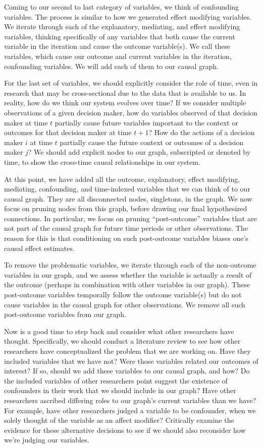 Coming to our second to last category of variables, we think of confounding variables.
The process is similar to how we generated effect modifying variables.
We iterate through each of the explanatory, mediating, and effect modifying variables, thinking specifically of any variables that both cause the current variable in the iteration and cause the outcome variable(s).
We call these variables, which cause our outcome and current variables in the iteration, confounding variables.
We will add each of them to our causal graph.

For the last set of variables, we should explicitly consider the role of time, even in research that may be cross-sectional due to the data that is available to us.
In reality, how do we think our system evolves over time?
If we consider multiple observations of a given decision maker, how do variables observed of that decision maker at time $t$ partially cause future variables important to the context or outcomes for that decision maker at time $t+1$?
How do the actions of a decision maker $i$ at time $t$ partially cause the future context or outcomes of a decision maker $j$?
We should add explicit nodes to our graph, subscripted or denoted by time, to show the cross-time causal relationships in our system.

At this point, we have added all the outcome, explanatory, effect modifying, mediating, confounding, and time-indexed variables that we can think of to our causal graph.
They are all disconnected nodes, singletons, in the graph.
We now focus on pruning nodes from this graph, before drawing our final hypothesized connections.
In particular, we focus on pruning ``post-outcome'' variables that are not part of the causal graph for future time periods or other observations.
The reason for this is that conditioning on such post-outcome variables biases one's causal effect estimates.

To remove the problematic variables, we iterate through each of the non-outcome variables in our graph, and we assess whether the variable is actually a result of the outcome (perhaps in combination with other variables in our graph).
These post-outcome variables temporally follow the outcome variable(s) but do not cause variables in the causal graph for other observations.
We remove all such post-outcome variables from our graph.

Now is a good time to step back and consider what other researchers have thought.
Specifically, we should conduct a literature review to see how other researchers have conceptualized the problem that we are working on.
Have they included variables that we have not?
Were those variables related our outcomes of interest?
If so, should we add these variables to our causal graph, and how?
Do the included variables of other researchers point suggest the existence of confounders in their work that we should include in our graph?
Have other researchers ascribed differing roles to our graph's current variables than we have?
For example, have other researchers judged a variable to be confounder, when we solely thought of the variable as an affect modifier?
Critically examine the evidence for these alternative decisions to see if we should also reconsider how we're judging our variables.

